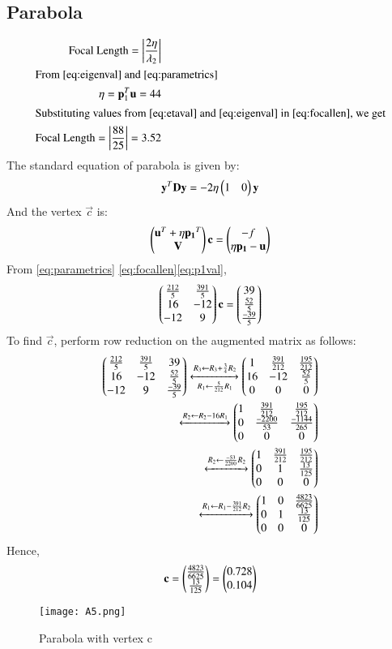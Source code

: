 \documentclass[journal,12pt,twocolumn]{IEEEtran}
\begin{document}
\subsection{Parabola}
\begin{align}
\text{Focal Length} = \left\vert\frac{2\eta}{\lambda_2}\right\vert \label{eq:focallen}\\
\intertext{From \eqref{eq:eigenval} and \eqref{eq:parametrics}}
\eta = \mathbf{p}_1^T\mathbf{u} = 44 \label{eq:etaval}\\
\intertext{Substituting values from \eqref{eq:etaval} and \eqref{eq:eigenval} in \eqref{eq:focallen}, we get}
\text{Focal Length} = \left\vert\frac{88}{25}\right\vert=3.52
\end{align}
The standard equation of parabola is given by:
\begin{align}
 \mathbf{y}^T\mathbf{D}\mathbf{y} = -2\eta \begin{pmatrix}1 & 0\end{pmatrix}\mathbf{y} \label{eq:parabola}
\end{align}
And the vertex $\vec{c}$ is:
\begin{align}
 \begin{pmatrix}\mathbf{u}^T+\eta \mathbf{p_1}^T \\ \mathbf{V}\end{pmatrix}\mathbf{c} = \begin{pmatrix}-f \\ \eta \mathbf{p_1}-\mathbf{u}\end{pmatrix}
\end{align}
From \eqref{eq:parametrics} \eqref{eq:focallen}\eqref{eq:p1val},
\begin{align}
\begin{pmatrix}\frac{212}{5} & \frac{391}{5} \\ 16 & -12 \\ -12 & 9\end{pmatrix}\mathbf{c}=\begin{pmatrix}39 \\ \frac{52}{5}\\ \frac{-39}{5}\end{pmatrix}
\end{align}
To find $\vec{c}$, perform row reduction on the augmented matrix as follows:
\begin{align}
    \begin{pmatrix}\frac{212}{5} & \frac{391}{5} & 39\\16 & -12 & \frac{52}{5}\\-12 & 9 & \frac{-39}{5}\end{pmatrix}\xleftrightarrow[R_1\leftarrow \frac{5}{212}R_1]{R_3\leftarrow R_3+\frac{3}{4}R_2}\begin{pmatrix}1 & \frac{391}{212} & \frac{195}{212}\\16 & -12 & \frac{52}{5}\\0&0&0\end{pmatrix}\\
    \xleftrightarrow{R_2\leftarrow R_2-16R_1}\begin{pmatrix} 1 & \frac{391}{212} & \frac{195}{212}\\0 & \frac{-2200}{53} & \frac{-1144}{265} \\0&0&0\end{pmatrix}\\\xleftrightarrow{R_2\leftarrow \frac{-53}{2200}R_2}\begin{pmatrix}1 & \frac{391}{212} & \frac{195}{212} \\0 & 1 & \frac{13}{125}\\0&0&0\end{pmatrix}\\\xleftrightarrow{R_1\leftarrow R_1-\frac{391}{212}R_2}\begin{pmatrix}1 & 0 & \frac{4823}{6625}\\0 & 1 & \frac{13}{125}\\0&0&0\end{pmatrix}
\end{align}
Hence,
\begin{align}
\mathbf{c}=\begin{pmatrix}\frac{4823}{6625}\\ \frac{13}{125}\end{pmatrix}= \begin{pmatrix}0.728 \\ 0.104\end{pmatrix}
\end{align}
\begin{figure}[h!]
	\centering
	\texttt{[image: A5.png]}
	\caption{Parabola with vertex c }
	\label{myfig}
\end{figure}
\end{document}
